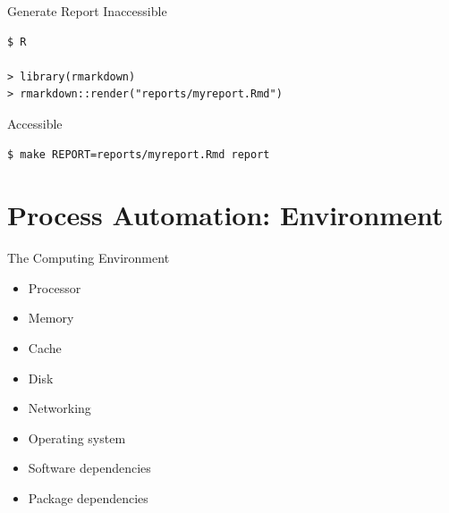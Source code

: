 \documentclass{beamer}
\begin{document}
\begin{frame}[fragile]{Generate Report}
Inaccessible
\begin{lstlisting}[style=custombash]
$ R

> library(rmarkdown)
> rmarkdown::render("reports/myreport.Rmd")
\end{lstlisting}

Accessible
\begin{lstlisting}[style=custombash]
$ make REPORT=reports/myreport.Rmd report
\end{lstlisting}

\end{frame}





\section{Process Automation: Environment}

\begin{frame}{The Computing Environment}

\begin{itemize}
\item Processor
\item Memory
\item Cache
\item Disk
\item Networking
\item Operating system
\item Software dependencies
\item Package dependencies
\end{itemize}

\end{frame}
\end{document}
